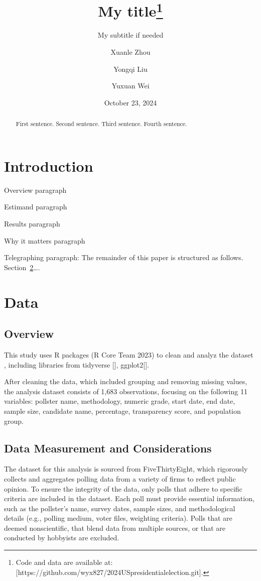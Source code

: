 \documentclass[
  letterpaper,
  DIV=11,
  numbers=noendperiod]{scrartcl}
\title{My title\thanks{Code and data are available at:
{[}https://github.com/wyx827/2024USpresidentialelection.git{]}.}}
\subtitle{My subtitle if needed}
\author{Xuanle Zhou \and Yongqi Liu \and Yuxuan Wei}
\date{October 23, 2024}
\begin{document}
\maketitle
\begin{abstract}
First sentence. Second sentence. Third sentence. Fourth sentence.
\end{abstract}


\section{Introduction}\label{introduction}

Overview paragraph

Estimand paragraph

Results paragraph

Why it matters paragraph

Telegraphing paragraph: The remainder of this paper is structured as
follows. Section~\ref{sec-data}\ldots.

\section{Data}\label{sec-data}

\subsection{Overview}\label{overview}

This study uses R packages (R Core Team 2023) to clean and analyz the
dataset , including libraries from tidyverse {[}{]}, ggplot2{[}{]}.

After cleaning the data, which included grouping and removing missing
values, the analysis dataset consists of 1,683 observations, focusing on
the following 11 variables: pollster name, methodology, numeric grade,
start date, end date, sample size, candidate name, percentage,
transparency score, and population group.

\subsection{Data Measurement and
Considerations}\label{data-measurement-and-considerations}

The dataset for this analysis is sourced from FiveThirtyEight, which
rigorously collects and aggregates polling data from a variety of firms
to reflect public opinion. To ensure the integrity of the data, only
polls that adhere to specific criteria are included in the dataset. Each
poll must provide essential information, such as the pollster's name,
survey dates, sample sizes, and methodological details (e.g., polling
medium, voter files, weighting criteria). Polls that are deemed
nonscientific, that blend data from multiple sources, or that are
conducted by hobbyists are excluded.
\end{document}
